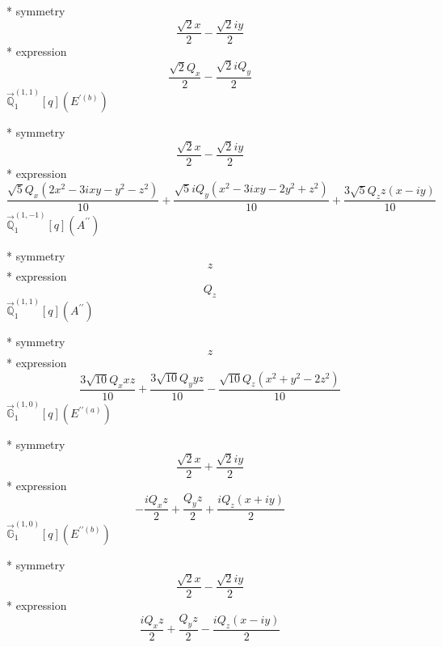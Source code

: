 \documentclass[fleqn,8pt]{jsarticle}
\begin{document}
\noindent\quad ** symmetry
\begin{dmath*}
\frac{\sqrt{2} x}{2} - \frac{\sqrt{2} i y}{2}
\end{dmath*}
\noindent\quad ** expression
\begin{dmath*}
\frac{\sqrt{2} Q_{x}}{2} - \frac{\sqrt{2} i Q_{y}}{2}
\end{dmath*}
\noindent\quad $\vec{\mathbb{Q}}_{1}^{(1,1)}[q](E^{\prime(b)})$

\noindent\quad ** symmetry
\begin{dmath*}
\frac{\sqrt{2} x}{2} - \frac{\sqrt{2} i y}{2}
\end{dmath*}
\noindent\quad ** expression
\begin{dmath*}
\frac{\sqrt{5} Q_{x} \left(2 x^{2} - 3 i x y - y^{2} - z^{2}\right)}{10} + \frac{\sqrt{5} i Q_{y} \left(x^{2} - 3 i x y - 2 y^{2} + z^{2}\right)}{10} + \frac{3 \sqrt{5} Q_{z} z \left(x - i y\right)}{10}
\end{dmath*}
\noindent\quad $\vec{\mathbb{Q}}_{1}^{(1,-1)}[q](A^{\prime\prime})$

\noindent\quad ** symmetry
\begin{dmath*}
z
\end{dmath*}
\noindent\quad ** expression
\begin{dmath*}
Q_{z}
\end{dmath*}
\noindent\quad $\vec{\mathbb{Q}}_{1}^{(1,1)}[q](A^{\prime\prime})$

\noindent\quad ** symmetry
\begin{dmath*}
z
\end{dmath*}
\noindent\quad ** expression
\begin{dmath*}
\frac{3 \sqrt{10} Q_{x} x z}{10} + \frac{3 \sqrt{10} Q_{y} y z}{10} - \frac{\sqrt{10} Q_{z} \left(x^{2} + y^{2} - 2 z^{2}\right)}{10}
\end{dmath*}
\noindent\quad $\vec{\mathbb{G}}_{1}^{(1,0)}[q](E^{\prime\prime(a)})$

\noindent\quad ** symmetry
\begin{dmath*}
\frac{\sqrt{2} x}{2} + \frac{\sqrt{2} i y}{2}
\end{dmath*}
\noindent\quad ** expression
\begin{dmath*}
- \frac{i Q_{x} z}{2} + \frac{Q_{y} z}{2} + \frac{i Q_{z} \left(x + i y\right)}{2}
\end{dmath*}
\noindent\quad $\vec{\mathbb{G}}_{1}^{(1,0)}[q](E^{\prime\prime(b)})$

\noindent\quad ** symmetry
\begin{dmath*}
\frac{\sqrt{2} x}{2} - \frac{\sqrt{2} i y}{2}
\end{dmath*}
\noindent\quad ** expression
\begin{dmath*}
\frac{i Q_{x} z}{2} + \frac{Q_{y} z}{2} - \frac{i Q_{z} \left(x - i y\right)}{2}
\end{dmath*}
\end{document}
